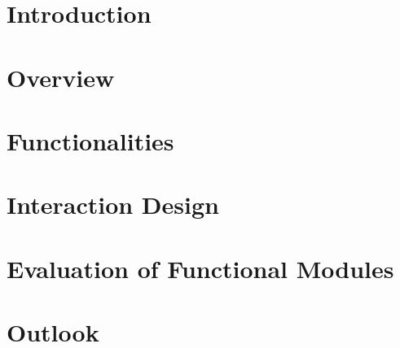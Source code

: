 \documentclass{article}
\begin{document}
\newpage
\tableofcontents
\newpage		
	\section{Introduction}
	
	\section{Overview}
	
	\section{Functionalities}
	
	\section{Interaction Design}
	
	\section{Evaluation of Functional Modules}
	
	\section{Outlook}
	
	
\end{document}
